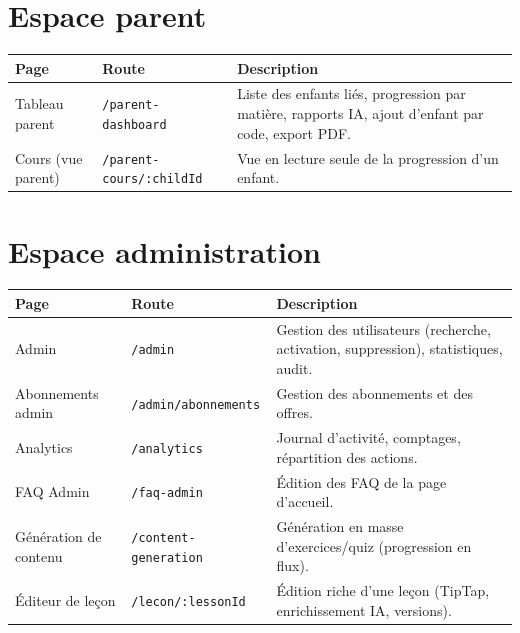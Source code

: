 \section{Espace parent}
\begin{longtable}{p{3.2cm}p{3.6cm}p{7.4cm}}
\toprule \textbf{Page} & \textbf{Route} & \textbf{Description} \\ \midrule \endhead
Tableau parent & \texttt{/parent-dashboard} & Liste des enfants liés, progression par matière, rapports IA, ajout d'enfant par code, export PDF. \\
Cours (vue parent) & \texttt{/parent-cours/:childId} & Vue en lecture seule de la progression d'un enfant. \\
\bottomrule
\end{longtable}

\section{Espace administration}
\begin{longtable}{p{3.4cm}p{3.6cm}p{7.2cm}}
\toprule \textbf{Page} & \textbf{Route} & \textbf{Description} \\ \midrule \endhead
Admin & \texttt{/admin} & Gestion des utilisateurs (recherche, activation, suppression), statistiques, audit. \\
Abonnements admin & \texttt{/admin/abonnements} & Gestion des abonnements et des offres. \\
Analytics & \texttt{/analytics} & Journal d'activité, comptages, répartition des actions. \\
FAQ Admin & \texttt{/faq-admin} & Édition des FAQ de la page d'accueil. \\
Génération de contenu & \texttt{/content-generation} & Génération en masse d'exercices/quiz (progression en flux). \\
Éditeur de leçon & \texttt{/lecon/:lessonId} & Édition riche d'une leçon (TipTap, enrichissement IA, versions). \\
\bottomrule
\end{longtable}

